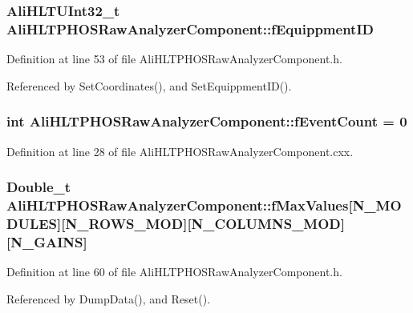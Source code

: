 \subsubsection{\setlength{\rightskip}{0pt plus 5cm}Ali\-HLTUInt32\_\-t {\bf Ali\-HLTPHOSRaw\-Analyzer\-Component::f\-Equippment\-ID}\hspace{0.3cm}{\tt  [private]}}\label{classAliHLTPHOSRawAnalyzerComponent_AliHLTPHOSRawAnalyzerComponentr0}




Definition at line 53 of file Ali\-HLTPHOSRaw\-Analyzer\-Component.h.

Referenced by Set\-Coordinates(), and Set\-Equippment\-ID().
\subsubsection{\setlength{\rightskip}{0pt plus 5cm}int {\bf Ali\-HLTPHOSRaw\-Analyzer\-Component::f\-Event\-Count} = 0\hspace{0.3cm}{\tt  [static, private]}}\label{classAliHLTPHOSRawAnalyzerComponent_AliHLTPHOSRawAnalyzerComponentv0}




Definition at line 28 of file Ali\-HLTPHOSRaw\-Analyzer\-Component.cxx.
\subsubsection{\setlength{\rightskip}{0pt plus 5cm}Double\_\-t {\bf Ali\-HLTPHOSRaw\-Analyzer\-Component::f\-Max\-Values}[N\_\-MODULES][N\_\-ROWS\_\-MOD][N\_\-COLUMNS\_\-MOD][N\_\-GAINS]\hspace{0.3cm}{\tt  [private]}}\label{classAliHLTPHOSRawAnalyzerComponent_AliHLTPHOSRawAnalyzerComponentr7}




Definition at line 60 of file Ali\-HLTPHOSRaw\-Analyzer\-Component.h.

Referenced by Dump\-Data(), and Reset().
